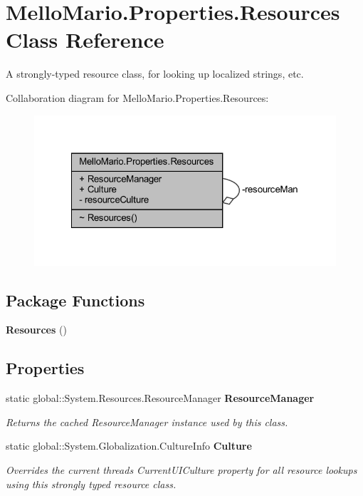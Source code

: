 \section{Mello\+Mario.\+Properties.\+Resources Class Reference}
\label{classMelloMario_1_1Properties_1_1Resources}


A strongly-\/typed resource class, for looking up localized strings, etc.  




Collaboration diagram for Mello\+Mario.\+Properties.\+Resources\+:
\nopagebreak
\begin{figure}[H]
\begin{center}
\leavevmode
\includegraphics[width=322pt]{classMelloMario_1_1Properties_1_1Resources__coll__graph}
\end{center}
\end{figure}
\subsection*{Package Functions}
\begin{DoxyCompactItemize}
\item 
\textbf{ Resources} ()
\end{DoxyCompactItemize}
\subsection*{Properties}
\begin{DoxyCompactItemize}
\item 
static global\+::\+System.\+Resources.\+Resource\+Manager \textbf{ Resource\+Manager}\hspace{0.3cm}{\ttfamily  [get]}
\begin{DoxyCompactList}\small\item\em Returns the cached Resource\+Manager instance used by this class. \end{DoxyCompactList}\item 
static global\+::\+System.\+Globalization.\+Culture\+Info \textbf{ Culture}\hspace{0.3cm}{\ttfamily  [get, set]}
\begin{DoxyCompactList}\small\item\em Overrides the current thread\textquotesingle{}s Current\+U\+I\+Culture property for all resource lookups using this strongly typed resource class. \end{DoxyCompactList}\end{DoxyCompactItemize}
